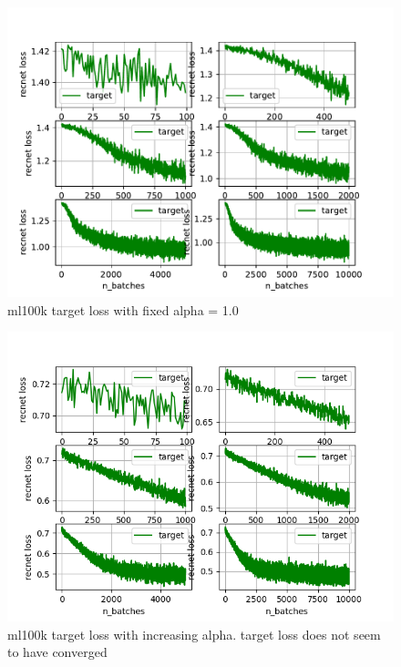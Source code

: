 \documentclass{article}
\begin{document}
\begin{figure}[t!]
\begin{center}
\includegraphics[width=1\textwidth]{figures/ml100k/target_loss_multipleplots.pdf}  
\end{center}
\caption{ml100k target loss with fixed alpha = 1.0}
\label{fig:ProperCover}
\end{figure}

\begin{figure}[t!]
\begin{center}
\includegraphics[width=1\textwidth]{figures/ml100k/target_loss_inc_alpha}  
\end{center}
\caption{ml100k target loss with increasing alpha. target loss does not seem to have converged}
\label{fig:ProperCover}
\end{figure}
\end{document}
